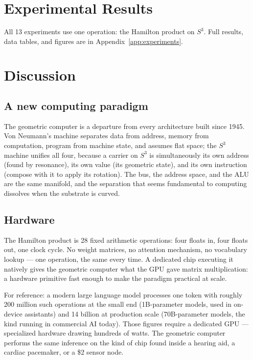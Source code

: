 \documentclass[12pt,a4paper]{article}
\theoremstyle{definition}
\theoremstyle{remark}
\begin{document}
\section{Experimental Results}
\label{sec:experiments}

All 13 experiments use one operation: the Hamilton product on $S^3$.
Full results, data tables, and figures are in Appendix~\ref{app:experiments}.

\section{Discussion}
\label{sec:discussion}

\subsection{A new computing paradigm}

The geometric computer is a departure from every architecture built since
1945. Von Neumann's machine separates data from address, memory from
computation, program from machine state, and assumes flat space; the $S^3$
machine unifies all four, because a carrier on $S^3$ is simultaneously its
own address (found by resonance), its own value (its geometric state), and
its own instruction (compose with it to apply its rotation). The bus, the
address space, and the ALU are the same manifold, and the separation that
seems fundamental to computing dissolves when the substrate is curved.

\subsection{Hardware}

The Hamilton product is 28 fixed arithmetic operations: four floats in, four
floats out, one clock cycle. No weight matrices, no attention mechanism, no
vocabulary lookup --- one operation, the same every time. A dedicated chip
executing it natively gives the geometric computer what the GPU gave matrix
multiplication: a hardware primitive fast enough to make the paradigm
practical at scale.

For reference: a modern large language model processes one token with roughly
200 million such operations at the small end (1B-parameter models, used in
on-device assistants) and 14 billion at production scale (70B-parameter
models, the kind running in commercial AI today). Those figures require a
dedicated GPU --- specialized hardware drawing hundreds of watts. The
geometric computer performs the same inference on the kind of chip found
inside a hearing aid, a cardiac pacemaker, or a \$2 sensor node.
\end{document}
